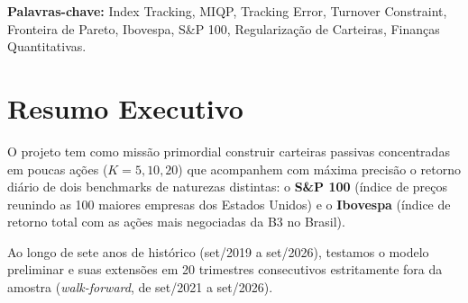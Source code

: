 \documentclass[11pt,a4paper]{article}
\begin{document}
\vspace{0.8em}
\noindent\textbf{Palavras-chave:} Index Tracking, MIQP, Tracking Error, Turnover Constraint, Fronteira de Pareto, Ibovespa, S\&P 100, Regularização de Carteiras, Finanças Quantitativas.

\newpage
\tableofcontents
\newpage

\section{Resumo Executivo}

O projeto tem como missão primordial construir carteiras passivas concentradas em poucas ações ($K = 5, 10, 20$) que acompanhem com máxima precisão o retorno diário de dois benchmarks de naturezas distintas: o \textbf{S\&P 100} (índice de preços reunindo as 100 maiores empresas dos Estados Unidos) e o \textbf{Ibovespa} (índice de retorno total com as ações mais negociadas da B3 no Brasil). 

Ao longo de sete anos de histórico (set/2019 a set/2026), testamos o modelo preliminar e suas extensões em 20 trimestres consecutivos estritamente fora da amostra (\textit{walk-forward}, de set/2021 a set/2026).
\end{document}

